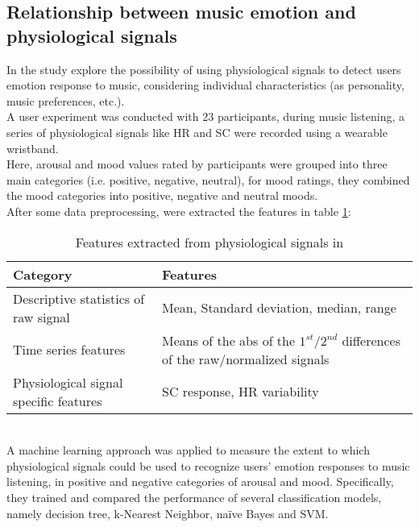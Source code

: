 \subsection{Relationship between music emotion and physiological signals}
In \cite{hu2018relationships} the study explore the possibility of using physiological signals to detect users emotion response to music, considering individual characteristics (as personality, music preferences, etc.).
\\ \indent
A user experiment was conducted with 23 participants, during music listening, a series of physiological signals like HR and SC were recorded using a wearable wristband.
\\ Here, arousal and mood values rated by participants were grouped into three main categories (i.e. positive, negative, neutral), for mood ratings, they combined the mood categories into positive, negative and neutral moods.
\\
After some data preprocessing, were extracted the features in table \ref{table:features_hu2018}:
\begin{table}[h!]
	\centering
	\begin{tabular}{|p{}|p{}|}
		\hline
		Category & Features\\ [0.5ex] 
		\hline \hline Descriptive statistics of raw signal & Mean, Standard deviation, median, range \\
		\hline Time series features & Means of the abs of the $1^{st}$/$2^{nd}$ differences of the raw/normalized signals \\
		\hline Physiological signal specific features & SC response, HR variability \\
		\hline
	\end{tabular}
	\caption{Features extracted from physiological signals in \cite{hu2018relationships}}
	\label{table:features_hu2018}
\end{table}
\\
A machine learning approach was applied to measure the extent to which physiological signals could be used to recognize users’ emotion responses to music listening, in positive and negative categories of arousal and mood. Specifically, they trained and compared the performance of several classification models, namely decision tree, k-Nearest Neighbor, naïve Bayes and SVM.

